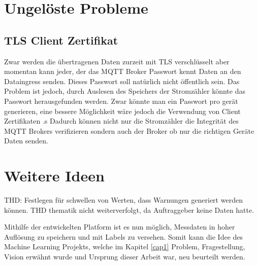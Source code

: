 \section{Ungelöste Probleme}

\subsection{\ac{TLS} Client Zertifikat}

Zwar werden die übertragenen Daten zurzeit mit \ac{TLS} verschlüsselt aber
momentan kann jeder, der das \ac{MQTT} Broker Passwort kennt Daten an den
Dataingress senden. Dieses Passwort soll natürlich nicht öffentlich sein.
Das Problem ist jedoch, durch Auslesen des Speichers der Stromzähler
könnte das Passwort herausgefunden werden.
Zwar könnte man ein Passwort pro gerät generieren, eine bessere Möglichkeit
wäre jedoch die Verwendung von Client Zertifikaten \parencite{rfc5246_2021}.s
Dadurch können nicht nur die Stromzähler die Integrität des \ac{MQTT} Brokers
verifizieren sondern auch der Broker ob nur die richtigen Geräte
Daten senden.



\section{Weitere Ideen}
THD: Festlegen für schwellen von Werten, dass Warnungen generiert werden können.
THD thematik nicht weiterverfolgt, da Auftraggeber keine Daten hatte.

Mithilfe der entwickelten Platform ist es nun möglich, Messdaten in hoher Auflösung zu speichern
und mit Labels zu versehen.
Somit kann die Idee des Machine Learning Projekts, welche im Kapitel \ref{cap1} Problem, Fragestellung, Vision erwähnt wurde und Ursprung dieser
Arbeit war, neu beurteilt werden.


